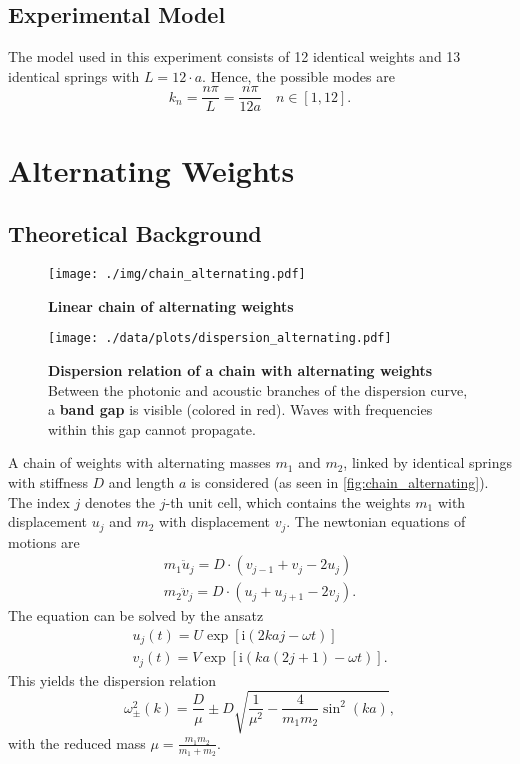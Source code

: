 \subsection{Experimental Model}\label{subsec:exp_mod_single}
The model used in this experiment consists of 12 identical weights and 13 identical springs with $L=12\cdot a$.
Hence, the possible modes are
\begin{equation*}
	k_n = \frac{n\pi}{L} = \frac{n\pi}{12a}\quad n\in[1, 12].
\end{equation*}

\section{Alternating Weights} \label{sec:alt_theory}
\subsection{Theoretical Background}
\begin{figure}[tbp]
	\centering
	\texttt{[image: ./img/chain\_alternating.pdf]}
	\caption[Chain of Alternating Weights]{\textbf{Linear chain of alternating weights}}
	\label{fig:chain_alternating}
\end{figure}
\begin{figure}[tbp]
	\centering
	\texttt{[image: ./data/plots/dispersion\_alternating.pdf]}
	\caption[Dispersion Relation of Chain With Alternating Weights]{\textbf{Dispersion relation of a chain with alternating weights} Between the photonic and acoustic branches of the dispersion curve, a \textbf{band gap} is visible (colored in red). Waves with frequencies within this gap cannot propagate.}
	\label{fig:dispersion_alternating}
\end{figure}
A chain of weights with alternating masses $m_1$ and $m_2$, linked by identical springs with stiffness $D$ and length $a$ is considered (as seen in \autoref{fig:chain_alternating}).
The index $j$ denotes the $j$-th unit cell, which contains the weights $m_1$ with displacement $u_j$ and $m_2$ with displacement $v_j$.
The newtonian equations of motions are
\begin{gather*}
	m_1 \ddot u_j = D \cdot \left(v_{j - 1} + v_{j} - 2 u_j \right)\\
	m_2 \ddot v_j = D \cdot \left(u_{j} + u_{j + 1} - 2 v_j \right).
\end{gather*}
The equation can be solved by the ansatz
\begin{gather*}
	u_j(t) = U \exp\left[\text{i} \left(2 k a j - \omega t\right)\right]\\
	v_j(t) = V \exp\left[\text{i} \left(k a (2 j + 1) - \omega t\right)\right].
\end{gather*}
This yields the dispersion relation
\begin{equation}
	\omega_\pm^2(k) = \frac{D}{\mu} \pm D\sqrt{\frac{1}{\mu^2} - \frac{4}{m_1 m_2}\sin^2\left(k a\right)},
\end{equation}
with the reduced mass $\mu = \frac{m_1 m_2}{m_1 + m_2}$.

